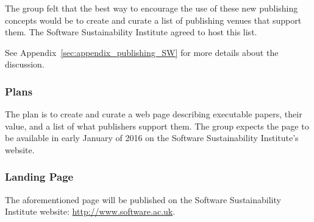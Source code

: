 The group felt that the best way to encourage the use of these new publishing
concepts would be to create and curate a list of publishing venues that
support them. The Software Sustainability Institute agreed to host this list.

See Appendix~\ref{sec:appendix_publishing_SW} for more details about the
discussion.

\subsubsection{Plans}

The plan is to create and curate a web page describing executable papers, their value, and
a list of what publishers support them. The group expects the page to be available in
early January of 2016 on the Software Sustainability Institute's website.

\subsubsection{Landing Page}

The aforementioned page will be published on the Software Sustainability
Institute website: \url{http://www.software.ac.uk}.
